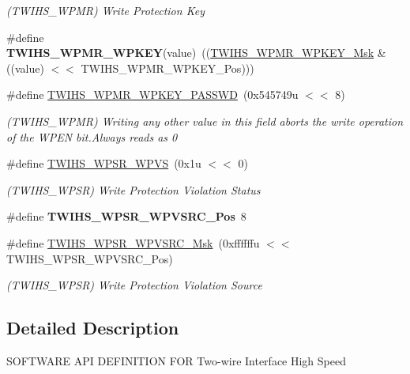 \begin{DoxyCompactItemize}
\begin{DoxyCompactList}\small\item\em (T\+W\+I\+H\+S\+\_\+\+W\+P\+MR) Write Protection Key \end{DoxyCompactList}\item 
\mbox{\label{group__SAME70__TWIHS_gad1eb34788ba32551c14ab91fc551eef3}} 
\#define {\bfseries T\+W\+I\+H\+S\+\_\+\+W\+P\+M\+R\+\_\+\+W\+P\+K\+EY}(value)~((\mbox{\hyperlink{group__SAMV71__TWIHS_gad433cad3185d19b00f7c05e49cbd7e13}{T\+W\+I\+H\+S\+\_\+\+W\+P\+M\+R\+\_\+\+W\+P\+K\+E\+Y\+\_\+\+Msk}} \& ((value) $<$$<$ T\+W\+I\+H\+S\+\_\+\+W\+P\+M\+R\+\_\+\+W\+P\+K\+E\+Y\+\_\+\+Pos)))
\item 
\mbox{\label{group__SAME70__TWIHS_ga99fd2617318e1cd366fe866630322573}} 
\#define \mbox{\hyperlink{group__SAME70__TWIHS_ga99fd2617318e1cd366fe866630322573}{T\+W\+I\+H\+S\+\_\+\+W\+P\+M\+R\+\_\+\+W\+P\+K\+E\+Y\+\_\+\+P\+A\+S\+S\+WD}}~(0x545749u $<$$<$ 8)
\begin{DoxyCompactList}\small\item\em (T\+W\+I\+H\+S\+\_\+\+W\+P\+MR) Writing any other value in this field aborts the write operation of the W\+P\+EN bit.\+Always reads as 0 \end{DoxyCompactList}\item 
\mbox{\label{group__SAME70__TWIHS_ga6238966d28ce45cc4ee70af09739d249}} 
\#define \mbox{\hyperlink{group__SAME70__TWIHS_ga6238966d28ce45cc4ee70af09739d249}{T\+W\+I\+H\+S\+\_\+\+W\+P\+S\+R\+\_\+\+W\+P\+VS}}~(0x1u $<$$<$ 0)
\begin{DoxyCompactList}\small\item\em (T\+W\+I\+H\+S\+\_\+\+W\+P\+SR) Write Protection Violation Status \end{DoxyCompactList}\item 
\mbox{\label{group__SAME70__TWIHS_ga520c6f8353b3d82140d67e67bdb3197f}} 
\#define {\bfseries T\+W\+I\+H\+S\+\_\+\+W\+P\+S\+R\+\_\+\+W\+P\+V\+S\+R\+C\+\_\+\+Pos}~8
\item 
\mbox{\label{group__SAME70__TWIHS_gaa7dece5c12c4e3de6238432a6fb75c76}} 
\#define \mbox{\hyperlink{group__SAME70__TWIHS_gaa7dece5c12c4e3de6238432a6fb75c76}{T\+W\+I\+H\+S\+\_\+\+W\+P\+S\+R\+\_\+\+W\+P\+V\+S\+R\+C\+\_\+\+Msk}}~(0xffffffu $<$$<$ T\+W\+I\+H\+S\+\_\+\+W\+P\+S\+R\+\_\+\+W\+P\+V\+S\+R\+C\+\_\+\+Pos)
\begin{DoxyCompactList}\small\item\em (T\+W\+I\+H\+S\+\_\+\+W\+P\+SR) Write Protection Violation Source \end{DoxyCompactList}\end{DoxyCompactItemize}


\subsection{Detailed Description}
S\+O\+F\+T\+W\+A\+RE A\+PI D\+E\+F\+I\+N\+I\+T\+I\+ON F\+OR Two-\/wire Interface High Speed 
